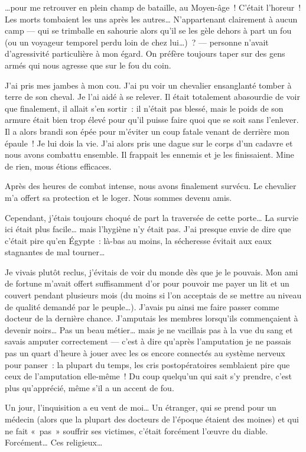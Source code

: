 {        \ldots pour me retrouver en plein champ de bataille, au Moyen-âge~!
		C’était l’horeur~!
		Les morts tombaient les uns après les autres…
		N’appartenant clairement à aucun camp — qui se trimballe en sahourie alors qu’il se les gèle dehors à part un fou (ou un voyageur temporel perdu loin de chez lui…)~? — personne n’avait d’agressivité particulière à mon égard.  On préfère toujours taper sur des gens armés qui nous agresse que sur le fou du coin.

		J’ai pris mes jambes à mon cou.  J’ai pu voir un chevalier ensanglanté tomber à terre de son cheval.
		Je l’ai aidé à se relever.  Il était totalement abasourdie de voir que finalement, il allait s’en sortir~:  il n’était pas blessé, mais le poids de son armure était bien trop élevé pour qu’il puisse faire quoi que se soit sans l’enlever.
		Il a alors brandi son épée pour m’éviter un coup fatale venant de derrière mon épaule~!
		Je lui dois la vie.
		J’ai alors pris une dague sur le corps d’un cadavre et nous avons combattu ensemble.
		Il frappait les ennemis et je les finissaient.
		Mine de rien, mous étions efficaces.

		Après des heures de combat intense, nous avons finalement survécu.
		Le chevalier m’a offert sa protection et le loger.
		Nous sommes devenu amis.

		Cependant, j’étais toujours choqué de part la traversée de cette porte…
		La survie ici était plus facile… mais l’hygiène n’y était pas.
		J’ai presque envie de dire que c’était pire qu’en Égypte~:  là-bas au moins, la sécheresse évitait aux eaux stagnantes de mal tourner…

		Je vivais plutôt reclus, j’évitais de voir du monde dès que je le pouvais.
		Mon ami de fortune m’avait offert suffisamment d’or pour pouvoir me payer un lit et un couvert pendant plusieurs mois (du moins si l’on acceptais de se mettre au niveau de qualité demandé par le peuple…).
		J’avais pu ainsi me faire passer comme docteur de la dernière chance.
		J’amputais les membres lorsqu’ils commençaient à devenir noirs…
		Pas un beau métier… mais je ne vacillais pas à la vue du sang et savais amputer correctement — c’est à dire qu’après l’amputation je ne passais pas un quart d’heure à jouer avec les os encore connectés au système nerveux pour panser~:  la plupart du temps, les cris postopératoires semblaient pire que ceux de l’amputation elle-même~!  Du coup quelqu’un qui sait s’y prendre, c’est plus qu’apprécié, même s’il a un accent de fou.

		Un jour, l’inquisition a eu vent de moi…
		Un étranger, qui se prend pour un médecin (alors que la plupart des docteurs de l’époque étaient des moines) et qui ne fait «~pas~» souffrir ses victimes, c’était forcément l’œuvre du diable.
		Forcément…
		Ces religieux…

}
